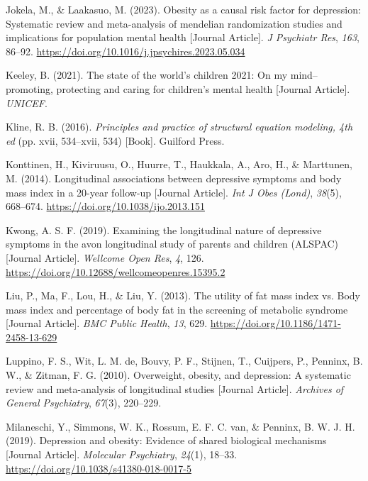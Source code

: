 \documentclass[
  letterpaper,
  DIV=11,
  numbers=noendperiod]{scrreport}
\newlength{\cslhangindent}
\newenvironment{CSLReferences}[2] %
 {\begin{list}{}{%
  \setlength{\itemindent}{0pt}
  \setlength{\leftmargin}{0pt}
  \setlength{\parsep}{0pt}
  \ifodd #1
   \setlength{\leftmargin}{\cslhangindent}
   \setlength{\itemindent}{-1\cslhangindent}
  \fi
  \setlength{\itemsep}{#2\baselineskip}}}
 {\end{list}}
\begin{document}
\begin{CSLReferences}{1}{0}
Jokela, M., \& Laakasuo, M. (2023). Obesity as a causal risk factor for
depression: Systematic review and meta-analysis of mendelian
randomization studies and implications for population mental health
{[}Journal Article{]}. \emph{J Psychiatr Res}, \emph{163}, 86--92.
\url{https://doi.org/10.1016/j.jpsychires.2023.05.034}

Keeley, B. (2021). The state of the world's children 2021: On my
mind--promoting, protecting and caring for children's mental health
{[}Journal Article{]}. \emph{UNICEF}.

Kline, R. B. (2016). \emph{Principles and practice of structural
equation modeling, 4th ed} (pp. xvii, 534--xvii, 534) {[}Book{]}.
Guilford Press.

Konttinen, H., Kiviruusu, O., Huurre, T., Haukkala, A., Aro, H., \&
Marttunen, M. (2014). Longitudinal associations between depressive
symptoms and body mass index in a 20-year follow-up {[}Journal
Article{]}. \emph{Int J Obes (Lond)}, \emph{38}(5), 668--674.
\url{https://doi.org/10.1038/ijo.2013.151}

Kwong, A. S. F. (2019). Examining the longitudinal nature of depressive
symptoms in the avon longitudinal study of parents and children (ALSPAC)
{[}Journal Article{]}. \emph{Wellcome Open Res}, \emph{4}, 126.
\url{https://doi.org/10.12688/wellcomeopenres.15395.2}

Liu, P., Ma, F., Lou, H., \& Liu, Y. (2013). The utility of fat mass
index vs. Body mass index and percentage of body fat in the screening of
metabolic syndrome {[}Journal Article{]}. \emph{BMC Public Health},
\emph{13}, 629. \url{https://doi.org/10.1186/1471-2458-13-629}

Luppino, F. S., Wit, L. M. de, Bouvy, P. F., Stijnen, T., Cuijpers, P.,
Penninx, B. W., \& Zitman, F. G. (2010). Overweight, obesity, and
depression: A systematic review and meta-analysis of longitudinal
studies {[}Journal Article{]}. \emph{Archives of General Psychiatry},
\emph{67}(3), 220--229.

Milaneschi, Y., Simmons, W. K., Rossum, E. F. C. van, \& Penninx, B. W.
J. H. (2019). Depression and obesity: Evidence of shared biological
mechanisms {[}Journal Article{]}. \emph{Molecular Psychiatry},
\emph{24}(1), 18--33. \url{https://doi.org/10.1038/s41380-018-0017-5}


\end{CSLReferences}
\end{document}
